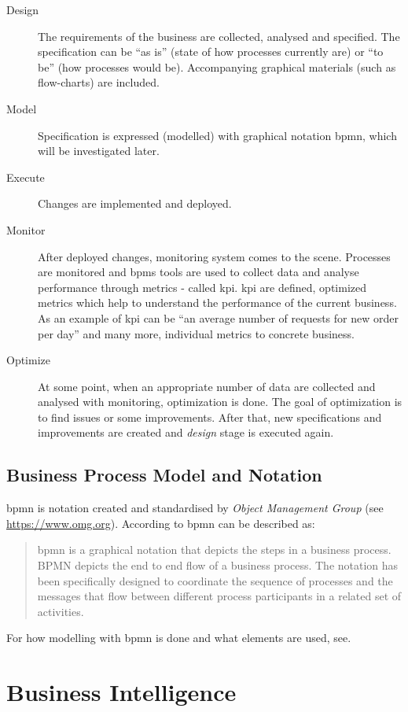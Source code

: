 \begin{description}
	\item[Design] The requirements of the business are collected, analysed and specified. The specification can be ``as is'' (state of how processes currently are) or ``to be'' (how processes would be). Accompanying graphical materials (such as flow-charts) are included.
    \item[Model] Specification is expressed (modelled) with graphical notation \gls{bpmn}, which will be investigated later.
    \item[Execute] Changes are implemented and deployed.
    \item[Monitor] After deployed changes, monitoring system comes to the scene. Processes are monitored and \gls{bpms} tools are used to collect data and analyse performance through metrics - called \gls{kpi}. \gls{kpi} are defined, optimized metrics which help to understand the performance of the current business. As an example of \gls{kpi} can be ``an average number of requests for new order per day'' and many more, individual metrics to concrete business.
    \item[Optimize] At some point, when an appropriate number of data are collected and analysed with monitoring, optimization is done. The goal of optimization is to find issues or some improvements. After that, new specifications and improvements are created and \textit{design} stage is executed again.
\end{description}

\subsection{Business Process Model and Notation}
\gls{bpmn} is notation created and standardised by \textit{Object Management Group} (see \url{https://www.omg.org}). According to\cite{bpmn-org-2018} \gls{bpmn} can be described as:
\begin{quote}
  \gls{bpmn} is a graphical notation that depicts the steps in a business process. BPMN depicts the end to end flow of a business process. The notation has been specifically designed to coordinate the sequence of processes and the messages that flow between different process participants in a related set of activities.
\end{quote}

For how modelling with \gls{bpmn} is done and what elements are used, see\cite{bpmn-org-2018}.

\section{Business Intelligence}

